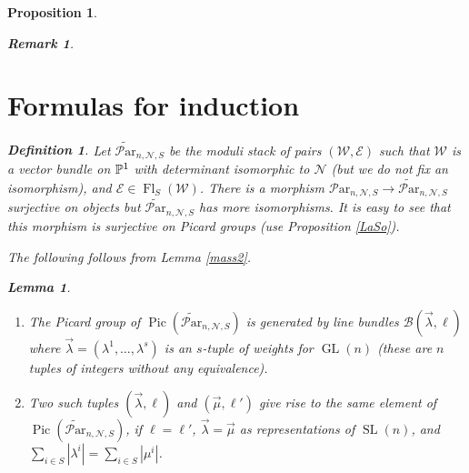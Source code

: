 \documentclass[11pt]{amsart}
\newcommand\op{\operatorname}
\newcommand\Pic{\operatorname{Pic}}
\newcommand\me{\mathcal{E}}
\newcommand\Fl{\operatorname{Fl}}
\newcommand\mw{\mathcal{W}}
\newcommand\mn{\mathcal{N}}
\newcommand\Par{\mathcal{P}\text{ar} }
\newtheorem{remark}[theorem]{ Remark}
\newtheorem{proposition}[theorem]{Proposition}
\newtheorem{lemma}[theorem]{Lemma}
\newtheorem{defi}[theorem]{Definition}
\numberwithin{theorem}{subsection}
\begin{document}
{\begin{proposition}
\begin{remark}
\end{remark}
\section{Formulas for induction}\label{explicitF}
\begin{defi}
Let $\widetilde{\Par}_{n,\mn,S}$ be the moduli stack of pairs $(\mw,\me)$ such that $\mw$ is a vector bundle on $\Bbb{P}^1$ with determinant isomorphic to $\mn$ (but we do not fix an isomorphism), and $\me\in\Fl_S(\mw)$. There is a morphism ${\Par}_{n,\mn,S}\to\widetilde{\Par}_{n,\mn,S}$ surjective on objects but  $\widetilde{\Par}_{n,\mn,S}$ has more isomorphisms. It is easy to see that this morphism is surjective on Picard groups (use Proposition \ref{LaSo}).
\end{defi}
The following follows from Lemma \ref{mass2}.
\begin{lemma}
\begin{enumerate}
\item The Picard group of  $\Pic(\widetilde{\Par}_{n,\mn,S})$ is generated  by line bundles $\mathcal{B}(\vec{\lambda},\ell)$ where $\vec{\lambda}=(\lambda^1,\dots,\lambda^s)$ is an $s$-tuple of weights for $\op{GL}(n)$ (these are $n$ tuples of integers without any equivalence).
\item Two such tuples $(\vec{\lambda},\ell)$ and $(\vec{\mu},\ell')$ give rise to the same element of $\Pic(\widetilde{\Par}_{n,\mn,S})$, if $\ell=\ell'$, $\vec{\lambda}=\vec{\mu}$ as representations
of $\op{SL}(n)$, and $\sum_{i\in S}|\lambda^i|=\sum_{i\in S}|\mu^i|$.
\end{enumerate}
\end{lemma}

\end{proposition}}
\end{document}

